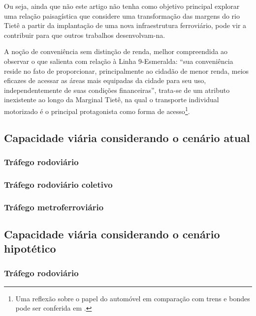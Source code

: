 \documentclass[
article,			%
11pt,				%
oneside,			%
a4paper,			%
english,			%
brazil,				%
sumario=tradicional
]{abntex2}
\begin{document}
	Ou seja, ainda que não este artigo não tenha como objetivo principal explorar uma relação paisagística que considere uma transformação das margens do rio Tietê a partir da implantação de uma nova infraestrutura ferroviário, pode vir a contribuir para que outros trabalhos desenvolvam-na.
	
	A noção de conveniência sem distinção de renda, melhor compreendida ao observar o que  salienta com relação à Linha 9-Esmeralda: ``sua conveniência reside no fato de proporcionar, principalmente ao cidadão de menor renda, meios eficazes de acessar as áreas mais equipadas da cidade para seu uso, independentemente de suas condições financeiras'', trata-se de um atributo inexistente ao longo da Marginal Tietê, na qual o transporte individual motorizado é o principal protagonista como forma de acesso\footnote{Uma reflexão sobre o papel do automóvel em comparação com trens e bondes pode ser conferida em .}.
	
	\subsection{Capacidade viária considerando o cenário atual} \label{s2:capacidadeatual}
	
	\subsubsection{Tráfego rodoviário} \label{s3:rodoatual}
	
	\subsubsection{Tráfego rodoviário coletivo} \label{s3:coletivoatual}
	
	\subsubsection{Tráfego metroferroviário} \label{s3:metroatual}
	
	\subsection{Capacidade viária considerando o cenário hipotético} \label{s2:capacidadefuturo}
	
	\subsubsection{Tráfego rodoviário} \label{s3:rodofuturo}
	
\end{document}
